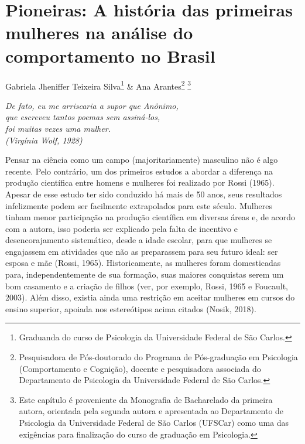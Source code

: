 \chapter{Pioneiras: A história das primeiras mulheres na análise do comportamento no Brasil}
\begin{flushright}
\begin{scriptsize}
Gabriela Jheniffer Teixeira Silva\footnote{Graduanda do curso de Psicologia da Universidade Federal de São Carlos.} \& Ana Arantes\footnote{Pesquisadora de Pós-doutorado do Programa de Pós-graduação em Psicologia (Comportamento e Cognição), docente e pesquisadora associada do Departamento de Psicologia da Universidade Federal de São Carlos.} \footnote{Este capítulo é proveniente da Monografia de Bacharelado da primeira autora, orientada pela segunda autora e apresentada ao Departamento de Psicologia da Universidade Federal de São Carlos (UFSCar) como uma das exigências para finalização do curso de graduação em Psicologia.}
\end{scriptsize}
\vspace{1cm}

\emph{De fato, eu me arriscaria a supor que Anônimo,\\
que escreveu tantos poemas sem assiná-los,\\
foi muitas vezes uma mulher.\\
(Virgínia Wolf, 1928)}
\end{flushright}

Pensar na ciência como um campo (majoritariamente) masculino não é algo recente. Pelo contrário, um dos primeiros estudos a abordar a diferença na produção científica entre homens e mulheres foi realizado por Rossi (1965). Apesar de esse estudo ter sido conduzido há mais de 50 anos, seus resultados infelizmente podem ser facilmente extrapolados para este século. Mulheres tinham menor participação na produção científica em diversas áreas e, de acordo com a autora, isso poderia ser explicado pela falta de incentivo e desencorajamento sistemático, desde a idade escolar, para que mulheres se engajassem em atividades que não as preparassem para seu futuro ideal: ser esposa e mãe (Rossi, 1965). Historicamente, as mulheres foram domesticadas para, independentemente de sua formação, suas maiores conquistas serem um bom casamento e a criação de filhos (ver, por exemplo, Rossi, 1965 e Foucault, 2003). Além disso, existia ainda uma restrição em aceitar mulheres em cursos do ensino superior, apoiada nos estereótipos acima citados (Nosik, 2018).

